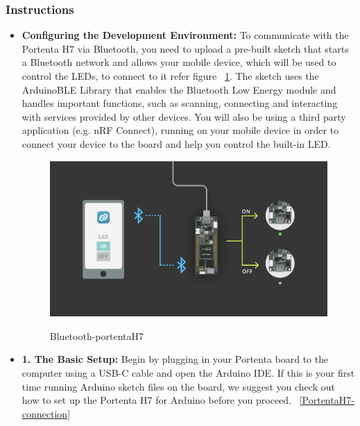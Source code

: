 \subsubsection{Instructions}
\begin{itemize}
	\item \textbf{Configuring the Development Environment:} To communicate with the Portenta H7 via Bluetooth, you need to upload a pre-built sketch that starts a Bluetooth  network and allows your mobile device, which will be used to control the LEDs, to connect to it refer figure ~\ref{Bluetooth-portentaH7}. The sketch uses the ArduinoBLE Library that enables the Bluetooth  Low Energy module and handles important functions, such as scanning, connecting and interacting with services provided by other devices. You will also be using a third party application (e.g. nRF Connect), running on your mobile device in order to connect your device to the board and help you control the built-in LED.  \cite{bluetoothPortentaH7:2024}
	
	\begin{figure}
		\begin{center}
			\includegraphics[width=0.7\linewidth]{Images/PortentaH7/Bluetooth-portentaH7.png}
			\caption{Bluetooth-portentaH7}
			\label{Bluetooth-portentaH7}\cite{bluetoothPortentaH7:2024}
		\end{center}
	\end{figure}
	
	\item \textbf{1. The Basic Setup:} Begin by plugging in your Portenta board to the computer using a USB-C cable and open the Arduino IDE. If this is your first time running Arduino sketch files on the board, we suggest you check out how to set up the Portenta H7 for Arduino before you proceed. ~\ref{PortentaH7-connection} \cite{bluetoothPortentaH7:2024}
	

\end{itemize}
